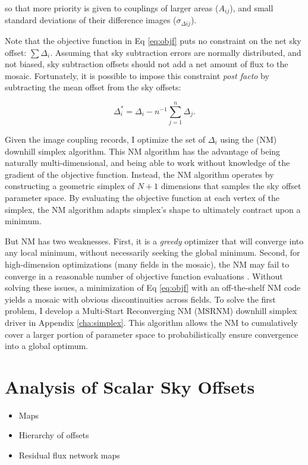 \documentclass[iop]{emulateapj}
\begin{document}
\noindent so that more priority is given to couplings of larger areas ($A_{ij}$), and small standard deviations of their difference images ($\sigma_{\Delta ij}$).

Note that the objective function in Eq \ref{eq:objf} puts no constraint on the net sky offset: $\sum \Delta_i$. Assuming that sky subtraction errors are normally distributed, and not biased, sky subtraction offsets should not add a net amount of flux to the mosaic. Fortunately, it is possible to impose this constraint \textit{post facto} by subtracting the mean offset from the sky offsets:

\begin{equation}
    \Delta_i^* = \Delta_i - n^{-1}\sum_{j=1}^n \Delta_j.
    \label{eq:netzero}
\end{equation}

Given the image coupling records, I optimize the set of $\Delta_i$ using the \cite{Nelder:1965} (NM) downhill simplex algorithm. This NM algorithm has the advantage of being naturally multi-dimensional, and being able to work without knowledge of the gradient of the objective function. Instead, the NM algorithm operates by constructing a geometric simplex of $N+1$ dimensions that samples the sky offset parameter space. By evaluating the objective function at each vertex of the simplex, the NM algorithm adapts simplex's shape to ultimately contract upon a minimum.

But NM has two weaknesses. First, it is a \emph{greedy} optimizer that will converge into any local minimum, without necessarily seeking the global minimum. Second, for high-dimension optimizations (many fields in the mosaic), the NM may fail to converge in a reasonable number of objective function evaluations \citep{Neumann:2006}. Without solving these issues, a minimization of Eq \ref{eq:objf} with an off-the-shelf NM code yields a mosaic with obvious discontinuities across fields. To solve the first problem, I develop a Multi-Start Reconverging NM (MSRNM) downhill simplex driver in Appendix \ref{cha:simplex}. This algorithm allows the NM to cumulatively cover a larger portion of parameter space to probabilistically ensure convergence into a global optimum.

\section{Analysis of Scalar Sky Offsets}

\begin{itemize}
\item Maps
\item Hierarchy of offsets
\item Residual flux network maps
\end{itemize}
\end{document}

